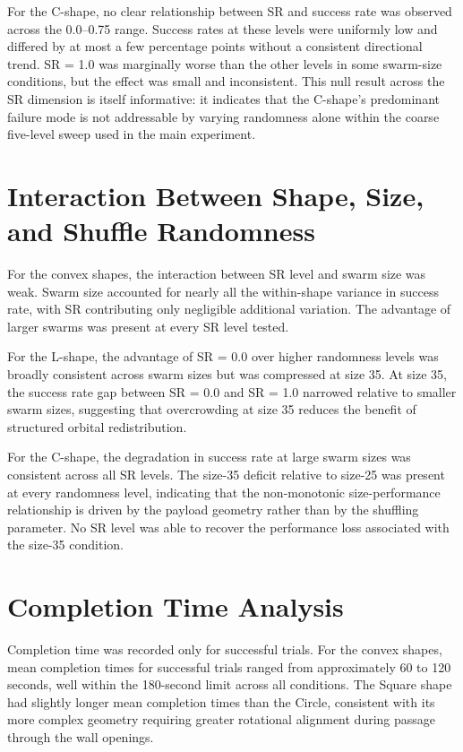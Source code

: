 For the C-shape, no clear relationship between SR and success rate was observed across the 0.0--0.75 range. Success rates at these levels were uniformly low and differed by at most a few percentage points without a consistent directional trend. SR = 1.0 was marginally worse than the other levels in some swarm-size conditions, but the effect was small and inconsistent. This null result across the SR dimension is itself informative: it indicates that the C-shape's predominant failure mode is not addressable by varying randomness alone within the coarse five-level sweep used in the main experiment.

\section{Interaction Between Shape, Size, and Shuffle Randomness}
\label{sec:results_interaction}

For the convex shapes, the interaction between SR level and swarm size was weak. Swarm size accounted for nearly all the within-shape variance in success rate, with SR contributing only negligible additional variation. The advantage of larger swarms was present at every SR level tested.

For the L-shape, the advantage of SR = 0.0 over higher randomness levels was broadly consistent across swarm sizes but was compressed at size 35. At size 35, the success rate gap between SR = 0.0 and SR = 1.0 narrowed relative to smaller swarm sizes, suggesting that overcrowding at size 35 reduces the benefit of structured orbital redistribution.

For the C-shape, the degradation in success rate at large swarm sizes was consistent across all SR levels. The size-35 deficit relative to size-25 was present at every randomness level, indicating that the non-monotonic size-performance relationship is driven by the payload geometry rather than by the shuffling parameter. No SR level was able to recover the performance loss associated with the size-35 condition.

\section{Completion Time Analysis}
\label{sec:results_time}

Completion time was recorded only for successful trials. For the convex shapes, mean completion times for successful trials ranged from approximately 60 to 120 seconds, well within the 180-second limit across all conditions. The Square shape had slightly longer mean completion times than the Circle, consistent with its more complex geometry requiring greater rotational alignment during passage through the wall openings.

